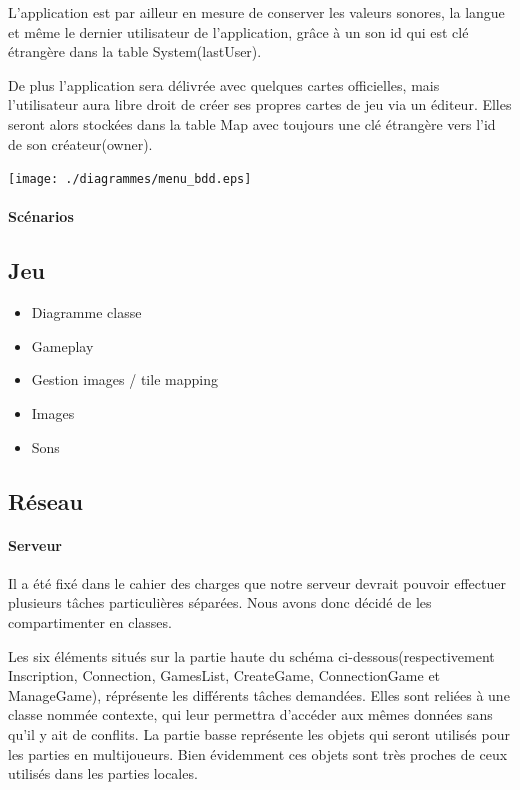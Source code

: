 \documentclass[a4paper,11pt]{report}
\begin{document}
				L'application est par ailleur en mesure de conserver
				les valeurs sonores, la langue et même le dernier utilisateur de
				l'application, grâce à un son id qui est clé étrangère dans la table System(lastUser).
				
				De plus l'application sera délivrée avec quelques cartes officielles, mais
				l'utilisateur aura libre droit de créer ses propres cartes de jeu via un
				éditeur. Elles seront alors stockées dans la table Map avec toujours une
				clé étrangère vers l'id de son créateur(owner). \\
				
				\begin{center}
				\texttt{[image: ./diagrammes/menu\_bdd.eps]}
				\end{center}
				
				
				\paragraph{Scénarios}
			
		\subsection{Jeu}
			\begin{itemize}
				\item{Diagramme classe}
				\item{Gameplay}
				\item{Gestion images / tile mapping}
				\item{Images}
				\item{Sons}
			\end{itemize}
			
		\subsection{Réseau}
			\paragraph{Serveur\\}
			
			Il a été fixé dans le cahier des charges que notre serveur devrait pouvoir
			effectuer plusieurs tâches particulières séparées. Nous avons donc décidé de
			les compartimenter en classes.
			
			Les six éléments situés sur la partie haute du schéma
			ci-dessous(respectivement Inscription, Connection, GamesList, CreateGame,
			ConnectionGame et ManageGame), réprésente les différents tâches demandées.
			Elles sont reliées à une classe nommée contexte, qui leur permettra d'accéder
			aux mêmes données sans qu'il y ait de conflits. La partie basse représente les
			objets qui seront utilisés pour les parties en multijoueurs. Bien évidemment
			ces objets sont très proches de ceux utilisés dans les parties locales.
		
\end{document}
